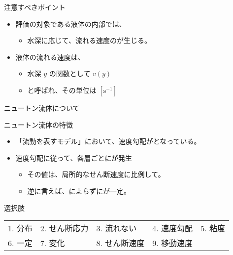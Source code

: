 \documentclass[uplatex,dvipdfmx,a4paper,11pt]{jsreport}
\begin{document}
\begin{qlist}
\begin{qlist2}
\begin{center}
\begin{minipage}{0.9\textwidth}
\begin{center}
\begin{itembox}[l]{注意すべきポイント}
\begin{itemize}
							\item 評価の対象である液体の内部では、
							\begin{itemize}
								\item 水深に応じて、流れる速度の\qbox{}が生じる。
							\end{itemize}
							\item 液体の流れる速度は、
							\begin{itemize}
								\item 水深 $y$ の関数として $v(y)$
								\item \qbox{}と呼ばれ、その単位は $[\mathrm{s^{-1}}]$
							\end{itemize}
						\end{itemize}
					\end{itembox}
					\end{center}
				\end{minipage}
			\end{center}
			
			\vspace{5mm}
			\qitem ニュートン流体について
			\begin{center}
				\begin{minipage}{0.9\textwidth}
					\begin{center}
					\begin{itembox}[l]{ニュートン流体の特徴}
						\begin{itemize}
							\item 「流動を表すモデル」において、速度勾配が\qbox{}となっている。
							\item 速度勾配に従って、各層ごとに\qbox{}が発生
							\begin{itemize}
								\item その値は、局所的なせん断速度に比例して\qbox{}。
								\item 逆に言えば、\qbox{}によらずに\qbox{}が一定。
							\end{itemize}
						\end{itemize}
					\end{itembox}
					\end{center}
				\end{minipage}
			\end{center}

		\end{qlist2}

		\begin{itembox}[l]{選択肢}
			\begin{center}
				\begin{tabular}{lllll}
					1. 分布	&2. せん断応力 &3. 流れない	&4. 速度勾配	&5. 粘度\\
					6. 一定	&7. 変化  &8. せん断速度	&9. 移動速度
				\end{tabular}
			\end{center}
		\end{itembox}
\end{qlist}
\end{document}
